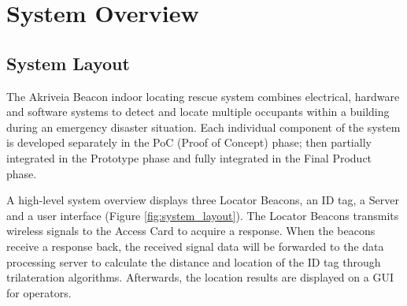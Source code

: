 %

\setcounter{section}{1}
\section{System Overview}
\bigskip
\subsection{System Layout}
\bigskip
The Akriveia Beacon indoor locating rescue system combines electrical, hardware and software systems to detect and locate multiple occupants within a building during an emergency disaster situation. Each individual component of the system is developed separately in the PoC (Proof of Concept) phase; then partially integrated in the Prototype phase and fully integrated in the Final Product phase.

\bigskip
A high-level system overview displays three Locator Beacons, an ID tag, a Server and a user interface (Figure \ref{fig:system_layout}).
The Locator Beacons transmits wireless signals to the Access Card to acquire a response.
When the beacons receive a response back, the received signal data will be forwarded to the data processing server to calculate the distance and location of the ID tag through trilateration algorithms.
Afterwards, the location results are displayed on a \Gls{GUI} for operators.


